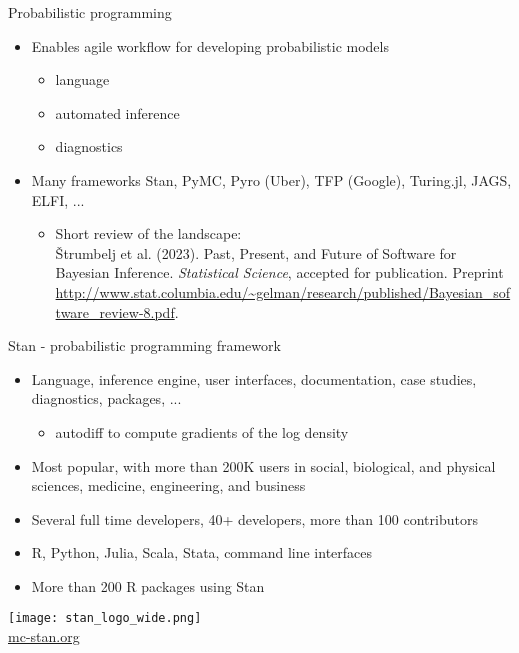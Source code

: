\documentclass[finnish,english,t]{beamer}
\begin{document}
\begin{frame}{Probabilistic programming}
  
  \begin{itemize}
  \item Enables agile workflow for developing probabilistic models
    \begin{itemize}
    \item language
    \item automated inference
    \item diagnostics
    \end{itemize}
  \item Many frameworks
    Stan, PyMC, Pyro (Uber), TFP (Google), Turing.jl, JAGS, ELFI, ...
    \begin{itemize}
    \item Short review of the landscape:\\
      {\small Štrumbelj et al. (2023). Past, Present, and Future of
        Software for Bayesian Inference. \textit{Statistical Science},
        accepted for publication. Preprint
        \url{http://www.stat.columbia.edu/~gelman/research/published/Bayesian_software_review-8.pdf}}.
      
    \end{itemize}
  \end{itemize}
  
\end{frame}

\begin{frame}{Stan - probabilistic programming framework}

   \begin{itemize}
   \item Language, inference engine, user interfaces, documentation,
     case studies, diagnostics, packages, ...
     \begin{itemize}
     \item autodiff to compute gradients of the log density
     \end{itemize}
   \item<2-> Most popular, with more than 200K users in social, biological, and
     physical sciences, medicine, engineering, and business
     
   \item<3-> Several full time developers, 40+ developers, more than 100 contributors
   \item<4-> R, Python, Julia, Scala, Stata, command line interfaces
    \item<4-> More than 200 R packages using Stan
   \end{itemize}
  \vfill
  \begin{center}
    \texttt{[image: stan\_logo\_wide.png]}\\
    \url{mc-stan.org}
  \end{center}
\end{frame}
\end{document}
